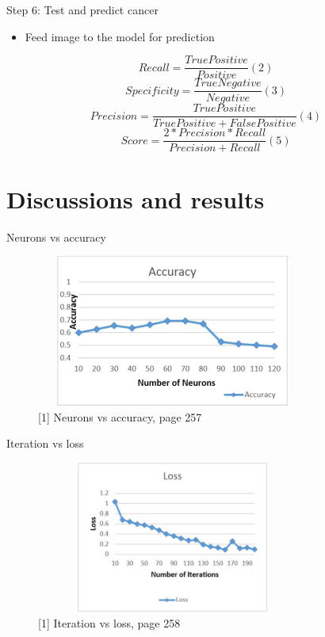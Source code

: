 \documentclass{beamer}
\begin{document}
\begin{frame}{Step 6: Test and predict cancer}
\begin{itemize}
		\item  Feed image to the model for prediction
\end{itemize}
$$ Recall = \frac{TruePositive}{Positive }  (2)$$
$$ Specificity = \frac{TrueNegative}{Negative} (3)$$
$$ Precision = \frac{TruePositive}{TruePositive + FalsePositive} (4)$$
$$ Score = \frac{2*Precision*Recall}{Precision+Recall} (5)$$
\end{frame} 


\section{Discussions and results}
\begin{frame}{Neurons vs accuracy}
\begin{figure}[H]
    \includegraphics[width=9cm,height=5cm]{images/discuss_1.png}
    \caption{[1] Neurons vs accuracy, page 257}
    \label{fig:L1}
\end{figure} 
\end{frame}

\begin{frame}{Iteration vs loss}
\begin{figure}[H]
    \includegraphics[width=9cm,height=5cm]{images/discuss_2.png}
    \caption{[1] Iteration vs loss, page 258}
    \label{fig:L1}
\end{figure} 
\end{frame}
\end{document}
